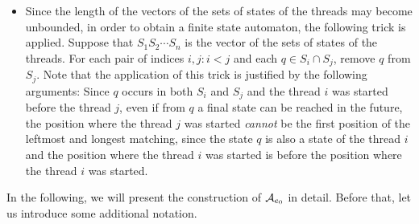 \begin{itemize}
%
%
	\item Since the length of the vectors of the sets of states of the threads may become unbounded, in order to obtain a finite state automaton, the following trick is applied. 
    Suppose that $S_1 S_2 \cdots S_n$ is the vector of the sets of states of the threads. 
    For each pair of indices $i, j: i < j$ and each $q \in S_i \cap S_j$, remove $q$ from $S_j$. 
    Note that the application of this trick is justified by the following arguments: Since $q$ occurs in both $S_i$ and $S_j$ and the thread $i$ was started before the thread $j$, even if from $q$  a final state can be reached in the future, the position where the thread $j$ was started \emph{cannot} be the first position of the leftmost and longest matching, since the state $q$ is also a state of the thread $i$ and the position where the thread $i$ was started is before the position where the thread $i$ was started.
\end{itemize}

In the following, we will present the construction of $\mathcal{A}_{e_0}$ in detail. Before that, let us introduce some additional notation.

